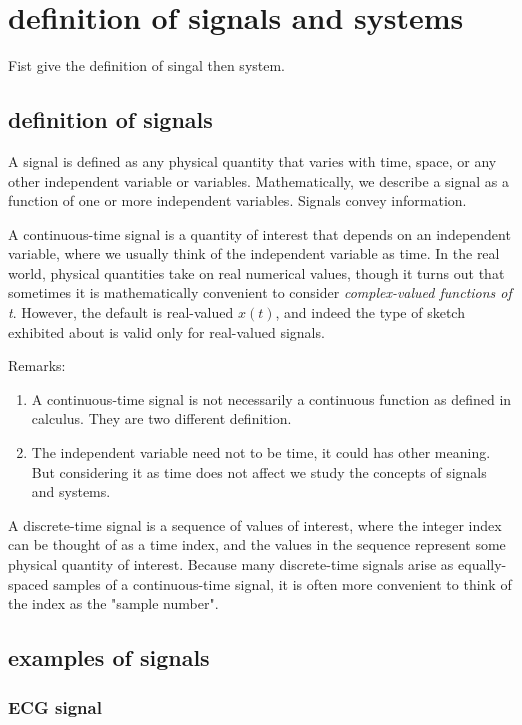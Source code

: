 \documentclass[koma,utopia,letterpaper,captions=tableheading,11pt,listings-sv,microtype,paralist,colorlinks=true,urlcolor=blue]{org-article}
\begin{document}
\section{definition of signals and systems}
\label{sec:org0083078}


Fist give the definition of singal then system.
\subsection{definition of signals}
\label{sec:orgc5b8c56}


A signal is defined as any physical quantity that varies with time, space, or
any other independent variable or variables. Mathematically, we describe a
signal as a function of one or more independent variables. Signals convey
information.

A continuous-time signal is a quantity of interest that depends on an
independent variable, where we usually think of the independent variable as
time. In the real world, physical quantities take on real numerical values,
though it turns out that sometimes it is mathematically convenient to consider
\emph{complex-valued functions of t}. However, the default is real-valued \(x(t)\),
and indeed the type of sketch exhibited about is valid only for real-valued
signals.

Remarks:
\begin{enumerate}
\item A continuous-time signal is not necessarily a continuous function as defined
in calculus. They are two different definition.
\item The independent variable need not to be time, it could has other meaning. But
considering it as time does not affect we study the concepts of signals and
systems.
\end{enumerate}

A discrete-time signal is a sequence of values of interest, where the integer
index can be thought of as a time index, and the values in the sequence
represent some physical quantity of interest. Because many discrete-time signals
arise as equally-spaced samples of a continuous-time signal, it is often more
convenient to think of the index as the "sample number".
\subsection{examples of signals}
\label{sec:org9e7ff00}

\subsubsection{ECG signal}
\label{sec:org6aa518f}
\end{document}
